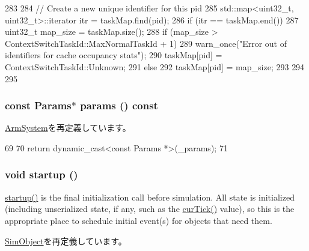 \begin{DoxyCode}
283 {
284     // Create a new unique identifier for this pid
285     std::map<uint32_t, uint32_t>::iterator itr = taskMap.find(pid);
286     if (itr == taskMap.end()) {
287         uint32_t map_size = taskMap.size();
288         if (map_size > ContextSwitchTaskId::MaxNormalTaskId + 1) {
289             warn_once("Error out of identifiers for cache occupancy stats");
290             taskMap[pid] = ContextSwitchTaskId::Unknown;
291         } else {
292             taskMap[pid] = map_size;
293         }
294     }
295 }
\end{DoxyCode}
\hypertarget{classLinuxArmSystem_acd3c3feb78ae7a8f88fe0f110a718dff}{
\subsubsection[{params}]{\setlength{\rightskip}{0pt plus 5cm}const {\bf Params}$\ast$ params () const}}
\label{classLinuxArmSystem_acd3c3feb78ae7a8f88fe0f110a718dff}


\hyperlink{classArmSystem_acd3c3feb78ae7a8f88fe0f110a718dff}{ArmSystem}を再定義しています。


\begin{DoxyCode}
69     {
70         return dynamic_cast<const Params *>(_params);
71     }
\end{DoxyCode}
\hypertarget{classLinuxArmSystem_aecc7d8debf54990ffeaaed5bac7d7d81}{
\subsubsection[{startup}]{\setlength{\rightskip}{0pt plus 5cm}void startup ()}}
\label{classLinuxArmSystem_aecc7d8debf54990ffeaaed5bac7d7d81}
\hyperlink{classLinuxArmSystem_aecc7d8debf54990ffeaaed5bac7d7d81}{startup()} is the final initialization call before simulation. All state is initialized (including unserialized state, if any, such as the \hyperlink{statistics_8hh_a7acdccbf0d35ce0c159c0cdd36371b22}{curTick()} value), so this is the appropriate place to schedule initial event(s) for objects that need them. 

\hyperlink{classSimObject_aecc7d8debf54990ffeaaed5bac7d7d81}{SimObject}を再定義しています。


